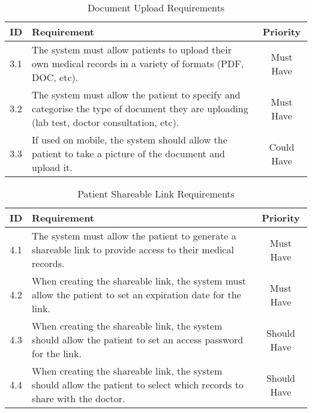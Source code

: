 \begin{table}[h!]
    \centering
    \begin{tabular}{|c|p{10cm}|c|}
    \hline
    \textbf{ID}  & \textbf{Requirement}  & \textbf{Priority} \\ \hline
    3.1  & The system must allow patients to upload their own medical records in a variety of formats (PDF, DOC, etc). & Must Have \\ \hline
    3.2  & The system must allow the patient to specify and categorise the type of document they are uploading (lab test, doctor consultation, etc). & Must Have \\ \hline
    3.3  & If used on mobile, the system should allow the patient to take a picture of the document and upload it. & Could Have \\ \hline
    \end{tabular}
    \caption{Document Upload Requirements}
\end{table}

\begin{table}[h!]
    \centering
    \begin{tabular}{|c|p{10cm}|c|}
    \hline
    \textbf{ID}  & \textbf{Requirement}  & \textbf{Priority} \\ \hline
    4.1  & The system must allow the patient to generate a shareable link to provide access to their medical records. & Must Have \\ \hline
    4.2  & When creating the shareable link, the system must allow the patient to set an expiration date for the link. & Must Have \\ \hline
    4.3  & When creating the shareable link, the system should allow the patient to set an access password for the link. & Should Have \\ \hline
    4.4  & When creating the shareable link, the system should allow the patient to select which records to share with the doctor. & Should Have \\ \hline
    \end{tabular}
    \caption{Patient Shareable Link Requirements}
\end{table}

